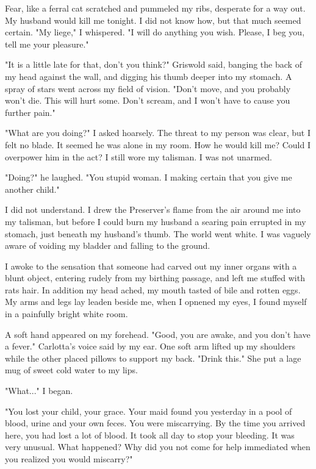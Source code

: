 \documentclass{article}
\begin{document}
Fear, like a ferral cat scratched and pummeled my ribs, desperate for a way out. My husband would kill me tonight. I did not know how, but that much seemed certain. "My liege," I whispered. "I will do anything you wish. Please, I beg you, tell me your pleasure."

"It is a little late for that, don't you think?" Griswold said, banging the back of my head against the wall, and digging his thumb deeper into my stomach. A spray of stars went across my field of vision. "Don't move, and you probably won't die. This will hurt some. Don't scream, and I won't have to cause you further pain."

"What are you doing?" I asked hoarsely. The threat to my person was clear, but I felt no blade. It seemed he was alone in my room. How he would kill me? Could I overpower him in the act? I still wore my talisman. I was not unarmed.

"Doing?" he laughed. "You stupid woman. I making certain that you give me another child."

I did not understand. I drew the Preserver's flame from the air around me into my talisman, but before I could burn my husband a searing pain errupted in my stomach, just beneath my husband's thumb. The world went white. I was vaguely aware of voiding my bladder and falling to the ground. 

\vspace{.5cm}

I awoke to the sensation that someone had carved out my inner organs with a blunt object, entering rudely from my birthing passage, and left me stuffed with rats hair. In addition my head ached, my mouth tasted of bile and rotten eggs. My arms and legs lay leaden beside me, when I opnened my eyes, I found myself in a painfully bright white room. 

A soft hand appeared on my forehead. "Good, you are awake, and  you don't have a fever." Carlotta's voice said by my ear. One soft arm lifted up my shoulders while the other placed pillows to support my back. "Drink this." She put a lage mug of sweet cold water to my lips. 

"What..." I began.

"You lost your child, your grace. Your maid found you yesterday in a pool of blood, urine and your own feces. You were miscarrying. By the time you arrived here, you had lost a lot of blood. It took all day to stop your bleeding. It was very unusual.  What happened? Why did you not come for help immediated when you realized you would miscarry?"
\end{document}
